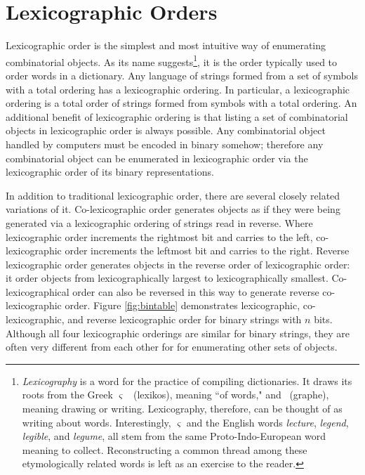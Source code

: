 \section{Lexicographic Orders}
    Lexicographic order is the simplest and most intuitive way of enumerating combinatorial objects.  As its name suggests\footnote{\emph{Lexicography} is a word for the practice of compiling dictionaries.  It draws its roots from the Greek \textlambda\textepsilon\textxi\textiota\textkappa\textomikron$\varsigma$ \ (lexikos), meaning ``of words," and \textgamma\textrho\textalpha\textphi\texteta \  (graphe), meaning drawing or writing.  Lexicography, therefore, can be thought of as writing about words.  Interestingly, \textlambda\textepsilon\textxi\textiota\textkappa\textomikron$\varsigma$ and the English words \emph{lecture}, \emph{legend}, \emph{legible}, and \emph{legume}, all stem from the same Proto-Indo-European word meaning to collect.  Reconstructing a common thread among these etymologically related words is left as an exercise to the reader.}, it is the order typically used to order words in a dictionary.  Any language of strings formed from a set of symbols with a total ordering has a lexicographic ordering.  In particular, a lexicographic ordering is a total order of strings formed from symbols with a total ordering.  An additional benefit of lexicographic ordering is that listing a set of combinatorial objects in lexicographic order is always possible. Any combinatorial object handled by computers must be encoded in binary somehow; therefore any combinatorial object can be enumerated in lexicographic order via the lexicographic order of its binary representations. 


In addition to traditional lexicographic order, there are several closely related variations of it. Co-lexicographic order generates objects as if they were being generated via a lexicographic ordering of strings read in reverse.  Where lexicographic order increments the rightmost bit and carries to the left, co-lexicographic order increments the leftmost bit and carries to the right. Reverse lexicographic order generates objects in the reverse order of lexicographic order: it order objects from lexicographically largest to lexicographically smallest. Co-lexicographical order can also be reversed in this way to generate reverse co-lexicographic order. Figure \ref{fig:bintable} demonstrates lexicographic, co-lexicographic, and reverse lexicographic order for binary strings with $n$ bits.  Although all four lexicographic orderings are similar for binary strings, they are often very different from each other for for enumerating other sets of objects.

